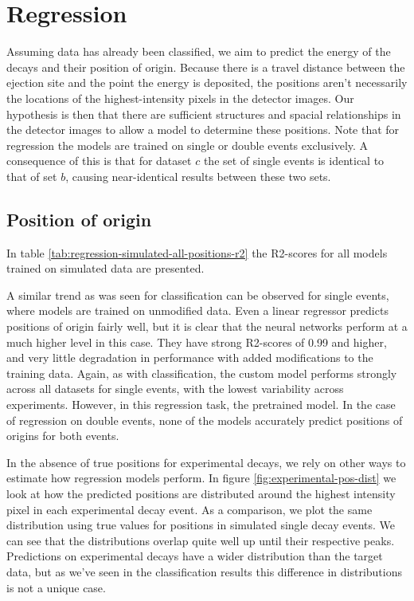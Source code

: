 \section{Regression}
Assuming data has already been classified, we aim to predict the energy of the decays and their
position of origin. Because there is a travel distance between the 
ejection site and the point the energy is deposited, the positions aren't necessarily
the locations of the highest-intensity pixels in the detector images. Our hypothesis is
then that there are sufficient structures and spacial relationships in the detector images to
allow a model to determine these positions.
Note that for regression the models are trained on single or double events exclusively.
A consequence of this is that for dataset $c$ the set of single events is
identical to that of set $b$, causing near-identical results between these two sets.

\subsection{Position of origin}
In table \ref{tab:regression-simulated-all-positions-r2} the R2-scores for all models
trained on simulated data are presented.

\noindent A similar trend as was seen for classification
can be observed for single events, where models are trained on unmodified data. Even
a linear regressor predicts positions of origin fairly well, but it is clear
that the neural networks perform at a much higher level in this case. They have strong
R2-scores of 0.99 and higher, and very little degradation in performance with added 
modifications to the training data. Again, as with classification, the custom model
performs strongly across all datasets for single events, with the lowest variability across
experiments. However, in this regression task, the pretrained model.
In the case of regression on double events, none of the models accurately
predict positions of origins for both events.

In the absence of true positions for experimental decays, we rely on other
ways to estimate how regression models perform.
In figure \ref{fig:experimental-pos-dist} we look at how the predicted positions
are distributed around the highest intensity pixel in each experimental decay event.
As a comparison, we plot the same distribution using true values for positions in
simulated single decay events. We can see that the distributions overlap quite well
up until their respective peaks. Predictions on experimental decays have a wider
distribution than the target data, but as we've seen in the classification results this
difference in distributions is not a unique case.

